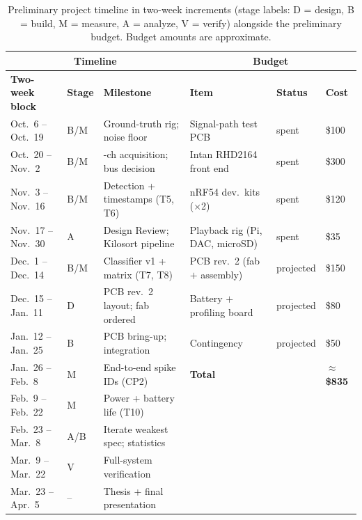 \documentclass[11pt]{article}
\begin{document}
\begin{table}[H]
\centering
\caption{Preliminary project timeline in two-week increments (stage labels: D = design,
B = build, M = measure, A = analyze, V = verify) alongside the preliminary budget.
Budget amounts are approximate.}
\label{tab:timeline}
{\footnotesize\sffamily
\setlength{\tabcolsep}{4pt}
\renewcommand{\arraystretch}{1.2}
\begin{tabular}{|l|l|>{\raggedright\arraybackslash}p{148pt}|>{\raggedright\arraybackslash}p{86pt}|l|l|}
\hline
\multicolumn{3}{|c|}{\textbf{Timeline}} & \multicolumn{3}{c|}{\textbf{Budget}} \\
\hline
\textbf{Two-week block} & \textbf{Stage} & \textbf{Milestone} & \textbf{Item} & \textbf{Status} & \textbf{Cost} \\
\hline
Oct.\ 6 -- Oct.\ 19   & B/M & Ground-truth rig; noise floor      & Signal-path test PCB & spent & \$100 \\
\hline
Oct.\ 20 -- Nov.\ 2   & B/M & 32-ch acquisition; bus decision    & Intan RHD2164 front end & spent & \$300 \\
\hline
Nov.\ 3 -- Nov.\ 16   & B/M & Detection + timestamps (T5, T6)    & nRF54 dev.\ kits ($\times$2) & spent & \$120 \\
\hline
Nov.\ 17 -- Nov.\ 30  & A   & Design Review; Kilosort pipeline   & Playback rig (Pi, DAC, microSD) & spent & \$35 \\
\hline
Dec.\ 1 -- Dec.\ 14   & B/M & Classifier v1 + matrix (T7, T8)    & PCB rev.\ 2 (fab $+$ assembly) & projected & \$150 \\
\hline
Dec.\ 15 -- Jan.\ 11  & D   & PCB rev.\ 2 layout; fab ordered    & Battery $+$ profiling board & projected & \$80 \\
\hline
Jan.\ 12 -- Jan.\ 25  & B   & PCB bring-up; integration          & Contingency & projected & \$50 \\
\hline
Jan.\ 26 -- Feb.\ 8   & M   & End-to-end spike IDs (CP2)         & \textbf{Total} & & \textbf{$\approx$\$835} \\
\hline
Feb.\ 9 -- Feb.\ 22   & M   & Power + battery life (T10)         & \cellcolor[gray]{0.82} & \cellcolor[gray]{0.82} & \cellcolor[gray]{0.82} \\
\hline
Feb.\ 23 -- Mar.\ 8   & A/B & Iterate weakest spec; statistics   & \cellcolor[gray]{0.82} & \cellcolor[gray]{0.82} & \cellcolor[gray]{0.82} \\
\hline
Mar.\ 9 -- Mar.\ 22   & V   & Full-system verification           & \cellcolor[gray]{0.82} & \cellcolor[gray]{0.82} & \cellcolor[gray]{0.82} \\
\hline
Mar.\ 23 -- Apr.\ 5   & --  & Thesis + final presentation        & \cellcolor[gray]{0.82} & \cellcolor[gray]{0.82} & \cellcolor[gray]{0.82} \\
\hline
\end{tabular}
}
\end{table}
\end{document}
